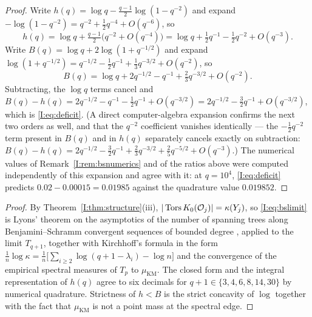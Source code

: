 \begin{proof}
Write $h(q)=\log q-\tfrac{q-1}2\log(1-q^{-2})$ and expand
$-\log(1-q^{-2})=q^{-2}+\tfrac12q^{-4}+O(q^{-6})$, so
\[
h(q)=\log q+\tfrac{q-1}2\bigl(q^{-2}+O(q^{-4})\bigr)
=\log q+\tfrac12q^{-1}-\tfrac12q^{-2}+O(q^{-3}) .
\]
Write $B(q)=\log q+2\log(1+q^{-1/2})$ and expand
$\log(1+q^{-1/2})=q^{-1/2}-\tfrac12q^{-1}+\tfrac13q^{-3/2}+O(q^{-2})$, so
\[
B(q)=\log q+2q^{-1/2}-q^{-1}+\tfrac23q^{-3/2}+O(q^{-2}) .
\]
Subtracting, the $\log q$ terms cancel and
$B(q)-h(q)=2q^{-1/2}-q^{-1}-\tfrac12q^{-1}+O(q^{-3/2})
=2q^{-1/2}-\tfrac32q^{-1}+O(q^{-3/2})$, which is \eqref{I:eq:deficit}. (A direct
computer-algebra expansion confirms the next two orders as well, and that the
$q^{-2}$ coefficient vanishes identically --- the $-\tfrac12q^{-2}$ term present in
$B(q)$ and in $h(q)$ separately cancels exactly on subtraction:
$B(q)-h(q)=2q^{-1/2}-\tfrac32q^{-1}+\tfrac23q^{-3/2}+\tfrac25q^{-5/2}+O(q^{-3})$.) The
numerical values of Remark~\ref{I:rem:bsnumerics} and of the ratios above were computed
independently of this expansion and agree with it: at $q=10^4$, \eqref{I:eq:deficit}
predicts $0.02-0.00015=0.01985$ against the quadrature value $0.019852$.
\end{proof}

\begin{proof}[Proof]
By Theorem~\ref{I:thm:structure}(iii), $|\operatorname{Tors} K_0(\mathcal{O}_j)|=\kappa(Y_j)$, so
\eqref{I:eq:bslimit} is Lyons' theorem on the asymptotics of the number of spanning trees
along Benjamini--Schramm convergent sequences of bounded degree \cite{Lyons2005},
applied to the limit $T_{q+1}$, together with Kirchhoff's formula in the form
$\frac1n\log\kappa=\frac1n\bigl[\sum_{i\ge2}\log(q+1-\lambda_i)-\log n\bigr]$ and the
convergence of the empirical spectral measures of $T_p$ to $\mu_{\mathrm{KM}}$. The
closed form and the integral representation of $h(q)$ agree to six decimals for
$q+1\in\{3,4,6,8,14,30\}$ by numerical quadrature. Strictness of $h<B$ is the strict
concavity of $\log$ together with the fact that $\mu_{\mathrm{KM}}$ is not a point mass
at the spectral edge.
\end{proof}

